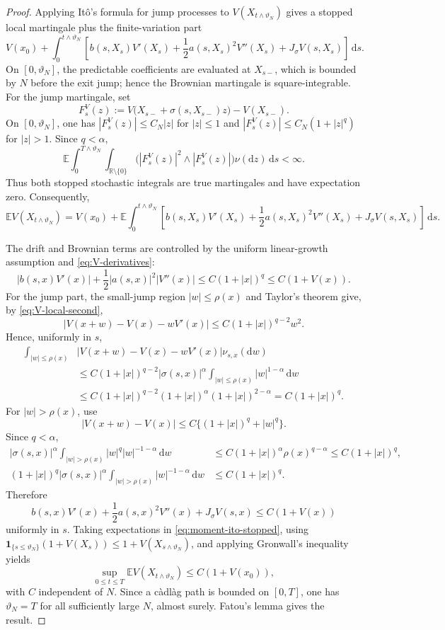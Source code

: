 \documentclass[11pt]{article}
\newcommand{\R}{\mathbb{R}}
\newcommand{\E}{\mathbb{E}}
\newcommand{\1}{\mathbf{1}}
\newcommand{\dd}{\,\mathrm{d}}
\newcommand{\md}{\mathrm{d}}
\begin{document}
\begin{proof}
Applying It\^o's formula for jump processes to $V(X_{t\wedge\vartheta_N})$ gives a stopped local martingale plus the finite-variation part
\[
V(x_0)+\int_0^{t\wedge\vartheta_N}
\left[b(s,X_s)V'(X_s)+\frac12a(s,X_s)^2V''(X_s)+J_\sigma V(s,X_s)\right]\dd s.
\]
On $[0,\vartheta_N]$, the predictable coefficients are evaluated at $X_{s-}$, which is bounded by $N$ before the exit jump; hence the Brownian martingale is square-integrable. For the jump martingale, set
\begin{equation}\label{eq:FV-definition}
F_s^V(z):=V\bigl(X_{s-}+\sigma(s,X_{s-})z\bigr)-V(X_{s-}).
\end{equation}
On $[0,\vartheta_N]$, one has $|F_s^V(z)|\le C_N|z|$ for $|z|\le1$ and $|F_s^V(z)|\le C_N(1+|z|^q)$ for $|z|>1$. Since $q<\alpha$,
\[
\E\int_0^{T\wedge\vartheta_N}\int_{\R\setminus\{0\}}
\bigl(|F_s^V(z)|^2\wedge |F_s^V(z)|\bigr)\nu(\md z)\dd s<\infty.
\]
Thus both stopped stochastic integrals are true martingales and have expectation zero. Consequently,
\begin{equation}\label{eq:moment-ito-stopped}
\E V(X_{t\wedge\vartheta_N})
=V(x_0)+\E\int_0^{t\wedge\vartheta_N}
\left[b(s,X_s)V'(X_s)+\frac12a(s,X_s)^2V''(X_s)+J_\sigma V(s,X_s)\right]\dd s.
\end{equation}

The drift and Brownian terms are controlled by the uniform linear-growth assumption and \eqref{eq:V-derivatives}:
\[
|b(s,x)V'(x)|+\frac12|a(s,x)|^2|V''(x)|
\le C(1+|x|)^q\le C(1+V(x)).
\]
For the jump part, the small-jump region $|w|\le\rho(x)$ and Taylor's theorem give, by \eqref{eq:V-local-second},
\[
  |V(x+w)-V(x)-wV'(x)|
  \le C(1+|x|)^{q-2}w^2.
\]
Hence, uniformly in $s$,
\begin{align*}
\int_{|w|\le\rho(x)}&|V(x+w)-V(x)-wV'(x)|\nu_{s,x}(\md w)\\
&\le C(1+|x|)^{q-2}|\sigma(s,x)|^\alpha
    \int_{|w|\le\rho(x)}|w|^{1-\alpha}\dd w\\
&\le C(1+|x|)^{q-2}(1+|x|)^\alpha(1+|x|)^{2-\alpha}
 =C(1+|x|)^q.
\end{align*}
For $|w|>\rho(x)$, use
\[
  |V(x+w)-V(x)|\le C\{(1+|x|)^q+|w|^q\}.
\]
Since $q<\alpha$,
\begin{align*}
|\sigma(s,x)|^\alpha\int_{|w|>\rho(x)}|w|^q|w|^{-1-\alpha}\dd w
&\le C(1+|x|)^\alpha\rho(x)^{q-\alpha}
 \le C(1+|x|)^q,\\
(1+|x|)^q|\sigma(s,x)|^\alpha\int_{|w|>\rho(x)}|w|^{-1-\alpha}\dd w
&\le C(1+|x|)^q.
\end{align*}
Therefore
\[
 b(s,x)V'(x)+\frac12a(s,x)^2V''(x)+J_\sigma V(s,x)
 \le C(1+V(x))
\]
uniformly in $s$. Taking expectations in \eqref{eq:moment-ito-stopped}, using
$\1_{\{s\le\vartheta_N\}}(1+V(X_s))\le1+V(X_{s\wedge\vartheta_N})$, and applying Gronwall's inequality yields
\[
  \sup_{0\le t\le T}\E V(X_{t\wedge\vartheta_N})\le C(1+V(x_0)),
\]
with $C$ independent of $N$. Since a c\`adl\`ag path is bounded on $[0,T]$, one has $\vartheta_N=T$ for all sufficiently large $N$, almost surely. Fatou's lemma gives the result.
\end{proof}
\end{document}
